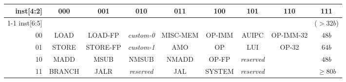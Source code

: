 \vspace{0.1in}
\begin{table*}[htbp]
\begin{center}
{\footnotesize
\setlength{\tabcolsep}{4pt}
\begin{tabular}{|r|c|c|c|c|c|c|c|c|}
  \hline
  inst[4:2] & 000    & 001      & 010            & 011      & 100    & 101            & 110                  & \cellcolor{gray}111 \\ \cline{1-1}
  inst[6:5] &        &          &                &          &        &                &                      & \cellcolor{gray}($>32b$)  \\ \hline
         00 & LOAD   & LOAD-FP  & {\em custom-0} & MISC-MEM & OP-IMM & AUIPC          & OP-IMM-32            & \cellcolor{gray} $48b$\\ \hline
         01 & STORE  & STORE-FP & {\em custom-1} & AMO      & OP     & LUI            & OP-32                & \cellcolor{gray} $64b$ \\ \hline
         10 & MADD   & MSUB     & NMSUB          & NMADD    & OP-FP  & {\em reserved} &                      & \cellcolor{gray} $48b$\\ \hline
         11 & BRANCH & JALR     & {\em reserved} & JAL      & SYSTEM & {\em reserved} &                      & \cellcolor{gray} $\geq80b$\\ \hline

 \end{tabular}
}
\end{center}
\vspace{-0.15in}
\caption{RISC-V base opcode map, inst[1:0]=11}
\label{opcodemap}
\end{table*}
